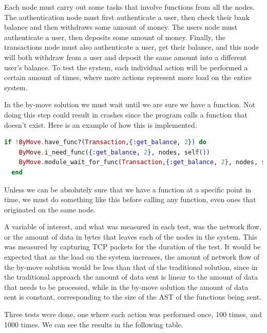 Each node must carry out some tasks that involve functions from all the nodes. The authentication node must first authenticate a user, then check their bank balance and then withdraws some amount of money. The users node must authenticate a user, then deposits some amount of money. Finally, the transactions node must also authenticate a user, get their balance, and this node will both withdraw from a user and deposit the same amount into a different user's balance. To test the system, each individual action will be performed a certain amount of times, where more actions represent more load on the entire system.

In the by-move solution we must wait until we are sure we have a function. Not doing this step could result in crashes since the program calls a function that doesn't exist. Here is an example of how this is implemented.

\begin{lstlisting}[language=elixir, caption=Checking and waiting for a function.]
  if !ByMove.have_func?(Transaction,{:get_balance, 2}) do
    ByMove.i_need_func({:get_balance, 2}, nodes, self())
    ByMove.module_wait_for_func(Transaction,{:get_balance, 2}, nodes, self(), [])
  end
\end{lstlisting}

Unless we can be absolutely sure that we have a function at a specific point in time, we must do something like this before calling any function, even ones that originated on the same node.

A variable of interest, and what was measured in each test, was the network flow, or the amount of data in bytes that leaves each of the nodes in the system. This was measured by capturing TCP packets for the duration of the test. It would be expected that as the load on the system increases, the amount of network flow of the by-move solution would be less than that of the traditional solution, since in the traditional approach the amount of data sent is linear to the amount of data that needs to be processed, while in the by-move solution the amount of data sent is constant, corresponding to the size of the AST of the functions being sent.

Three tests were done, one where each action was performed once, 100 times, and 1000 times. We can see the results in the following table.

